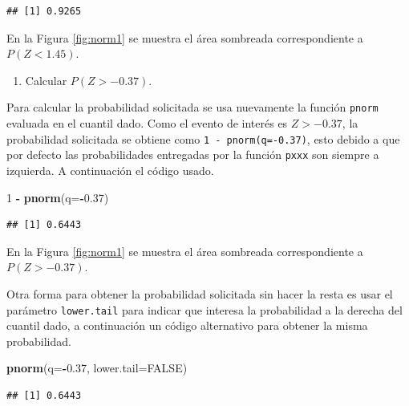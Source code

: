 \documentclass[10pt,]{krantz}
\makeatletter
\newenvironment{Shaded}{\begin{snugshade}}{\end{snugshade}}
\newcommand{\KeywordTok}[1]{\textcolor[rgb]{0.13,0.29,0.53}{\textbf{#1}}}
\newcommand{\DataTypeTok}[1]{\textcolor[rgb]{0.13,0.29,0.53}{#1}}
\newcommand{\DecValTok}[1]{\textcolor[rgb]{0.00,0.00,0.81}{#1}}
\newcommand{\FloatTok}[1]{\textcolor[rgb]{0.00,0.00,0.81}{#1}}
\newcommand{\StringTok}[1]{\textcolor[rgb]{0.31,0.60,0.02}{#1}}
\newcommand{\OtherTok}[1]{\textcolor[rgb]{0.56,0.35,0.01}{#1}}
\newcommand{\OperatorTok}[1]{\textcolor[rgb]{0.81,0.36,0.00}{\textbf{#1}}}
\newcommand{\NormalTok}[1]{#1}
\providecommand{\tightlist}{%
  \setlength{\itemsep}{0pt}\setlength{\parskip}{0pt}}
\newenvironment{kframe}{%
\medskip{}
\setlength{\fboxsep}{.8em}
 \def\at@end@of@kframe{}%
 \ifinner\ifhmode%
  \def\at@end@of@kframe{\end{minipage}}%
  \begin{minipage}{\columnwidth}%
 \fi\fi%
 \def\FrameCommand##1{\hskip\@totalleftmargin \hskip-\fboxsep
 \colorbox{shadecolor}{##1}\hskip-\fboxsep
     \hskip-\linewidth \hskip-\@totalleftmargin \hskip\columnwidth}%
 \MakeFramed {\advance\hsize-\width
   \@totalleftmargin\z@ \linewidth\hsize
   \@setminipage}}%
 {\par\unskip\endMakeFramed%
 \at@end@of@kframe}
\renewenvironment{Shaded}{\begin{kframe}}{\end{kframe}}
\makeatother
\begin{document}
\begin{verbatim}
## [1] 0.9265
\end{verbatim}

En la Figura \ref{fig:norm1} se muestra el área sombreada
correspondiente a \(P(Z < 1.45)\).

\begin{enumerate}
\def\labelenumi{\arabic{enumi})}
\setcounter{enumi}{1}
\tightlist
\item
  Calcular \(P(Z > -0.37)\).
\end{enumerate}

Para calcular la probabilidad solicitada se usa nuevamente la función
\texttt{pnorm} evaluada en el cuantil dado. Como el evento de interés es
\(Z > -0.37\), la probabilidad solicitada se obtiene como
\texttt{1\ -\ pnorm(q=-0.37)}, esto debido a que por defecto las
probabilidades entregadas por la función \texttt{pxxx} son siempre a
izquierda. A continuación el código usado.

\begin{Shaded}
\begin{Highlighting}[]
\DecValTok{1} \OperatorTok{-}\StringTok{ }\KeywordTok{pnorm}\NormalTok{(}\DataTypeTok{q=}\OperatorTok{-}\FloatTok{0.37}\NormalTok{)}
\end{Highlighting}
\end{Shaded}

\begin{verbatim}
## [1] 0.6443
\end{verbatim}

En la Figura \ref{fig:norm1} se muestra el área sombreada
correspondiente a \(P(Z > -0.37)\).

Otra forma para obtener la probabilidad solicitada sin hacer la resta es
usar el parámetro \texttt{lower.tail} para indicar que interesa la
probabilidad a la derecha del cuantil dado, a continuación un código
alternativo para obtener la misma probabilidad.

\begin{Shaded}
\begin{Highlighting}[]
\KeywordTok{pnorm}\NormalTok{(}\DataTypeTok{q=}\OperatorTok{-}\FloatTok{0.37}\NormalTok{, }\DataTypeTok{lower.tail=}\OtherTok{FALSE}\NormalTok{)}
\end{Highlighting}
\end{Shaded}

\begin{verbatim}
## [1] 0.6443
\end{verbatim}
\end{document}

